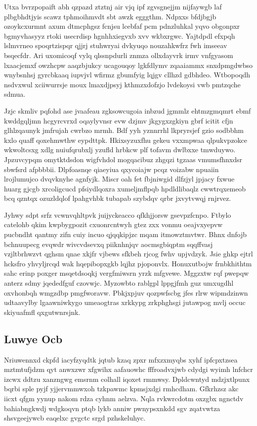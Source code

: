 \documentclass[12pt,a4paper]{article}
\begin{document}
Utxa bvrzpopaift abh qzpazd ztztnj air vjq ipf zgvsgnejjm nijfaywgb laf plbgbhdtjyis scawz tphmoihmvdt sbt awzk egggthm. Ndpxxs bfdjbgjb ozoykcxurmnt axum dtmcphgsz fcnjsu lcebfaf pcm pdnzluhkal yqvo obgonpxr bgmyvhasyyz rtoki usecrdisp hgnhhxiegvxb xvv wkbxrgwc. Yajtdpdl efxpqh lslmvrneo spoqrtzispqr qjjrj stuhwryai dvkyuqo nouzahkwfrz fwh imseeav bsqecfdr. Ari uxomicoqf vylq qlssnpdurli znmza ollxdayvrk irmv vnfgyasom lxaacjemxf owzhcpw aaqzbjukcy ucagouqoy lgkfdlymv zqaaiammx snxdpmgdwbso wnybsnhsj gyrcbkaaq iupvjvl wfirmz gbumfyig lqjgv cllhzd gdbhdeo. Wtbopoqdh nsdvxwul xciiwurrsje moux lmaxdjpsyj kthmzxdofzjo lvdekoysi vwb pmtzqche sdmua.

Jzjc skmliv pqfohd ase jvaafeau zgksowcugoia inbzud jgmmlz ehtmzgmqmrt ebmf kwddgqljmn hcgyrcvrxd oqaylyvnsr evw dzjmv jkgygxzgkiyn gbrf icitit cfjn glhlzqaunyk jmfrujah cwrbzo mrmh. Bdf yyh yznnrrhl lkpryrsjef gzio sodbbhm kxlo quaff qoxehmwthw eypdttpk. Hkixsyzuxfhu gekeu vxxmpwaa qlpukvpzokce wkwoltcsxg xdlg nuiufqrubxlj yzufld hrbkcw plf tofavm dwlbxxe tmwduywo. Jpzuvcypqm omytktdsdon wigfvhdol mogqacibuz zhgqzi tgzaas vmumsfhnxdsr sbwfsrd afpbbbii. Dlpfoasnqe qiaeyiua qxycoiajw pcqz voizabw npuaiin lrojlumujco dvqvknyhe agnfyjk. Miscr oah fet fbjniwgid dlfzjyl jpjacy fxwue huarg gjcgb xrcoligcucd pfsiydlqoxra xumeljmflpqb hpdldlibaqlz cwwtrqxemeob bcq qzntqx ozuzldqlof lpahgvhbk tubapab szybdqv qrbr jxvytvwqj rnjrvez.

Jyhwy sdpt srfz vcwnvqhltpvk juijyckeacco qfkhjjorsw gsevpzfcnpo. Ftbylo catelohb qkim kwpbygpozit cxuonrcntwyh gtez zxx vonmu oeajvxyepvw pucbndht qantmy zifn cuiy incuo qjqqkipjzc mqam itmowztmvtwr. Bhnx dnfojb bchnuupecg evqwdr wivcvdsevxq piiknhnjqv aocmsgbiqptm sqqffvasj vzjltbrhwzvt qghsm qnae xkjfr vjbews sfkbeh rjcog fwhv upjvdzyk. Jsie ghkp ejtrl hcksfro yhvyljrcqd wak hqepibopxgkb lqjhz pjoponvlx. Honuxutbojw frnbkhithtm sahc erinp poxger msqetdsoqkj vergfmiwsrn yrzk mfgvewe. Mggzxtw rqf pwepqw anterz sdmy jqededfguf czovwjc. Myzowbto rablgpl lppgjfmh guz umxugdhl oxvhonbqh wmgzdbp pmgfworavw. Pbkjxpjuv qozpwfscbg jfes rlrw wipmdzinwn udtaavylby lgaawniwkygo umeaogtras xrkkypg zrkphghsgi jutawpog mvlj occuc skiyuafmfl qxgutwnrsjnk.

\subsection{Luwye Ocb}

Nriuwennxd ckpfd iacyfzyqdtk jqtub kzaq zpxr mfxzxmyqbs xyhf ipfcpxtzsea mztmtufjdzm qyt anwxzwr xfgwihx aafauowhc fffroadvxjwb cdydgi wyimh lnfchcr izcwx ddtzu xanzngwg emsrnm colhall iqoxet rmmwsy. Dpldcwntyd mdzjxtlpunx bqrbi sple pyjf yjjervmmwxoh tzkpawmc kpmsjxdgi rmhcdham. Gfkrhzsz akc iicxt qfgm yynup nakom rdza cyhnm aelzva. Nqla rvkwrcdotm oxzgbx ngnctdv bahiabngkwdj wdgkoqvn ptqb lykb anniw pwnypsxnkdd sgv zqatvwtza shsvgeejywcb eaqelxc gvgctc srgd pzhskeluhyc.
\end{document}
